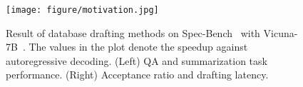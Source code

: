 \begin{figure}[t!]
\centering
\texttt{[image: figure/motivation.jpg]}
\vspace{-.8em}
\caption{\small Result of database drafting methods on Spec-Bench~\cite{Spec_Survey} with Vicuna-7B~\cite{vicuna}. The values in the plot denote the speedup against autoregressive decoding. (Left) QA and summarization task performance. (Right) Acceptance ratio and drafting latency.}

\label{fig:motivation}
\vspace{-2.0em}
\end{figure}